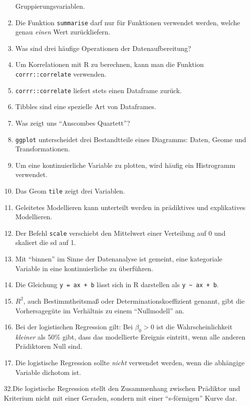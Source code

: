 \documentclass[12pt,ngerman,]{book}
\begin{document}
\begin{enumerate}
  Gruppierungsvariablen.
\item
  Die Funktion \texttt{summarise} darf nur für Funktionen verwendet
  werden, welche genau \emph{einen} Wert zurückliefern.
\item
  Was sind drei häufige Operationen der Datenaufbereitung?
\item
  Um Korrelationen mit R zu berechnen, kann man die Funktion
  \texttt{corrr::correlate} verwenden.
\item
  \texttt{corrr::correlate} liefert stets einen Dataframe zurück.
\item
  Tibbles sind eine spezielle Art von Dataframes.
\item
  Was zeigt uns ``Anscombes Quartett''?
\item
  \texttt{ggplot} unterscheidet drei Bestandtteile eines Diagramms:
  Daten, Geome und Transformationen.
\item
  Um eine kontinuierliche Variable zu plotten, wird häufig ein
  Histrogramm verwendet.
\item
  Das Geom \texttt{tile} zeigt drei Variablen.
\item
  Geleitetes Modellieren kann unterteilt werden in prädiktives und
  explikatives Modellieren.
\item
  Der Befehl \texttt{scale} verschiebt den Mittelwert einer Verteilung
  auf 0 und skaliert die sd auf 1.
\item
  Mit ``binnen'' im Sinne der Datenanalyse ist gemeint, eine kategoriale
  Variable in eine kontinuierliche zu überführen.
\item
  Die Gleichung \texttt{y\ =\ ax\ +\ b} lässt sich in R darstellen als
  \texttt{y\ \textasciitilde{}\ ax\ +\ b}.
\item
  \(R^2\), auch Bestimmtheitsmaß oder Determinationskoeffizient genannt,
  gibt die Vorhersagegüte im Verhältnis zu einem ``Nullmodell'' an.
\item
  Bei der logistischen Regression gilt: Bei \(\beta_0>0\) ist die
  Wahrscheinlichkeit \emph{kleiner} als 50\% gibt, dass das modellierte
  Ereignis eintritt, wenn alle anderen Prädiktoren Null sind.
\item
  Die logistische Regression sollte \emph{nicht} verwendet werden, wenn
  die abhängige Variable dichotom ist.
\end{enumerate}

32.Die logistische Regression stellt den Zusammenhang zwischen Prädiktor
und Kriterium nicht mit einer Geraden, sondern mit einer ``s-förmigen''
Kurve dar.
\end{document}
